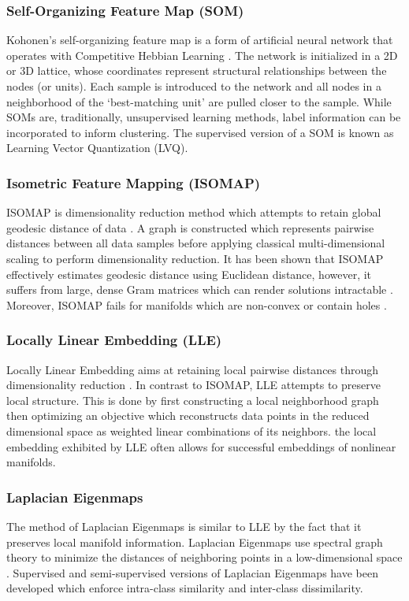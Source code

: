 \documentclass[conference]{IEEEtran}
\begin{document}
	\subsubsection*{Self-Organizing Feature Map (SOM)} Kohonen's self-organizing feature map is a form of artificial neural network that operates with Competitive Hebbian Learning \cite{Haykin2009NeuralNetworks,Kohonen1990SOM,Fritzke1995GrowingNeuralGas}.  The network is initialized in a 2D or 3D lattice, whose coordinates represent structural relationships between the nodes (or units).  Each sample is introduced to the network and all nodes in a neighborhood of the `best-matching unit' are pulled closer to the sample. While SOMs are, traditionally, unsupervised learning methods, label information can be incorporated to inform clustering.  The supervised version of a SOM  is known as Learning Vector Quantization (LVQ).
	\subsubsection*{Isometric Feature Mapping (ISOMAP)} ISOMAP is dimensionality reduction method which attempts to retain global geodesic distance of data \cite{Tenenbaum2000Isomap}.  A graph is constructed which represents pairwise distances between all data samples before  applying classical multi-dimensional scaling to perform dimensionality reduction.  It has been shown that ISOMAP effectively estimates geodesic distance using Euclidean distance, however, it suffers from large, dense Gram matrices which can render solutions intractable \cite{Thorstensen2009ManifoldThesis}.  Moreover, ISOMAP fails for manifolds which are non-convex or contain holes \cite{VanDerMaaten2009DRReview}.
	\subsubsection*{Locally Linear Embedding (LLE)} Locally Linear Embedding aims at retaining local pairwise distances through dimensionality reduction \cite{Roweis2000LLE,Saul2001LLEIntro}.  In contrast to ISOMAP, LLE attempts to preserve local structure.  This is done by first constructing a local neighborhood graph then optimizing an objective which reconstructs data points in the reduced dimensional space as weighted linear combinations of its neighbors.  the local embedding exhibited by LLE often allows for successful embeddings of nonlinear manifolds.
	\subsubsection*{Laplacian Eigenmaps}  The method of Laplacian Eigenmaps is similar to LLE by the fact that it preserves local manifold information.  Laplacian Eigenmaps use spectral graph theory to minimize the distances of neighboring points in a low-dimensional space \cite{Belkin2003LaplacianEigenmaps,VanDerMaaten2009DRReview}.  Supervised and semi-supervised versions of Laplacian Eigenmaps have been developed which enforce intra-class similarity and inter-class dissimilarity.  
	 
\end{document}
